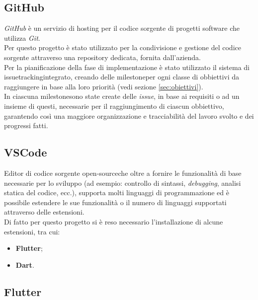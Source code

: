 \subsection*{GitHub}
\label{subsec:github}

\emph{GitHub}\cite{site:github} è un servizio di hosting per il codice sorgente di progetti software che utilizza \emph{Git}.\\
Per questo progetto è stato utilizzato per la condivisione e gestione del codice sorgente attraverso una repository dedicata, fornita dall'azienda.\\
Per la pianificazione della fase di implementazione è stato utilizzato il sistema di \gls{issuetracking}\glsoccur integrato, creando delle \gls{milestone}\glsoccur per ogni classe di obbiettivi da raggiungere in base alla loro priorità (vedi sezione \ref{sec:obiettivi}).\\
In ciascuna \gls{milestone}\glsoccur sono state create delle \emph{issue}, in base ai requisiti o ad un insieme di questi, necessarie per il raggiungimento di ciascun obbiettivo, garantendo così una maggiore organizzazione e tracciabilità del lavoro svolto e dei progressi fatti.\\

\subsection*{VSCode}
\label{subsec:vscode}

Editor di codice sorgente \gls{open-source}\glsoccur che oltre a fornire le funzionalità di base necessarie per lo sviluppo (ad esempio: controllo di sintassi, \emph{debugging}, analisi statica del codice, ecc.), supporta molti linguaggi di programmazione ed è possibile estendere le sue funzionalità o il numero di linguaggi supportati attraverso delle estensioni.\\
Di fatto per questo progetto si è reso necessario l'installazione di alcune estensioni, tra cui:
\begin{itemize}
    \item \textbf{Flutter}\cite{site:flutter-extension};
    \item \textbf{Dart}\cite{site:dart-extension}.
\end{itemize}

\subsection*{Flutter}
\label{subsec:flutter}

